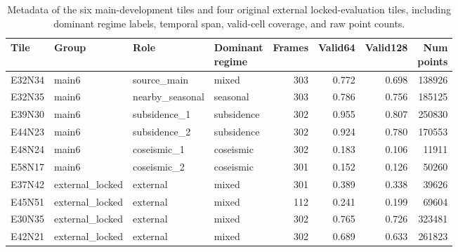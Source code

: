 \documentclass[lettersize,journal]{IEEEtran}
\begin{document}
\begin{table}[!t]
  \centering
  \caption{Metadata of the six main-development tiles and four original external locked-evaluation tiles, including dominant regime labels, temporal span, valid-cell coverage, and raw point counts.}
  \label{tab:table01}
  \scriptsize
  \begin{adjustbox}{max width=\textwidth}
  \begin{tabular}{lllp{}rrrr}
    \toprule
    Tile & Group & Role & \shortstack{Dominant\\regime} & Frames & Valid64 & Valid128 & \shortstack{Num\\points} \\
    \midrule
    E32N34 & main6 & source\_main & mixed & 303 & 0.772 & 0.698 & 138926 \\
    E32N35 & main6 & nearby\_seasonal & seasonal & 303 & 0.786 & 0.756 & 185125 \\
    E39N30 & main6 & subsidence\_1 & subsidence & 302 & 0.955 & 0.807 & 250830 \\
    E44N23 & main6 & subsidence\_2 & subsidence & 302 & 0.924 & 0.780 & 170553 \\
    E48N24 & main6 & coseismic\_1 & coseismic & 302 & 0.183 & 0.106 & 11911 \\
    E58N17 & main6 & coseismic\_2 & coseismic & 301 & 0.152 & 0.126 & 50260 \\
    E37N42 & external\_locked & external & mixed & 301 & 0.389 & 0.338 & 39626 \\
    E45N51 & external\_locked & external & mixed & 112 & 0.241 & 0.199 & 69604 \\
    E30N35 & external\_locked & external & mixed & 302 & 0.765 & 0.726 & 323481 \\
    E42N21 & external\_locked & external & mixed & 302 & 0.689 & 0.633 & 261823 \\
    \bottomrule
  \end{tabular}
  \end{adjustbox}
\end{table}
\end{document}
